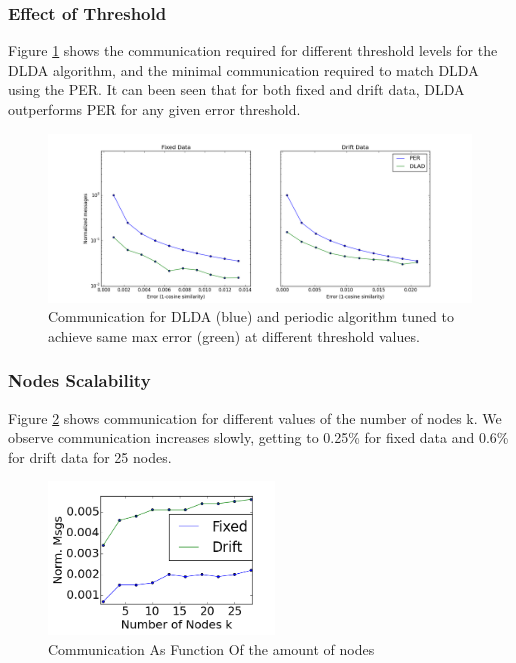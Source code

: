 \documentclass[11pt,twocolumn,varwidth=true,a4paper,fleqn]{article}
\begin{document}
\subsubsection{Effect of Threshold}
Figure \ref{PERvsDLDAoverError} shows the communication required for different
threshold levels for the DLDA algorithm, and the minimal
communication required to match DLDA using the PER.	
It can been seen that for both fixed and drift data, DLDA outperforms PER for
any given error threshold.
 \begin{figure}[ht]
	\centering
	\includegraphics[width=\textwidth]{PER/PERvsDLDAoverError.png}
	\caption{Communication for DLDA (blue) and 
	periodic algorithm tuned to achieve same max error
	(green) at different threshold values.}
	\label{PERvsDLDAoverError}
	\end{figure}

	
\subsubsection{Nodes Scalability}
Figure \ref{Nodes} shows communication for different values of the
number of nodes k. We observe communication increases
slowly, getting to 0.25\% for fixed data and 0.6\% for drift data for 25 nodes.
	\begin{figure}[h]
	\centering
	\includegraphics[width=60mm]{CommunicationOfFixedVsDrift/Nodes.png}
	\caption{Communication As Function Of the amount of nodes}
	\label{Nodes}
	\end{figure}
\end{document}
